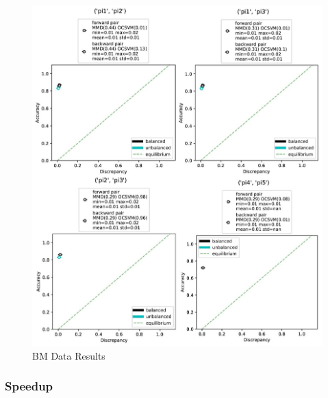 \documentclass{mpaper}
\begin{document}
\begin{figure}
    \centering
    \includegraphics[scale= 0.5]{bm_results.JPG}
    \caption{BM Data Results}
    \label{fig:bm_results}
\end{figure}

\subsubsection{Speedup}
\end{document}

